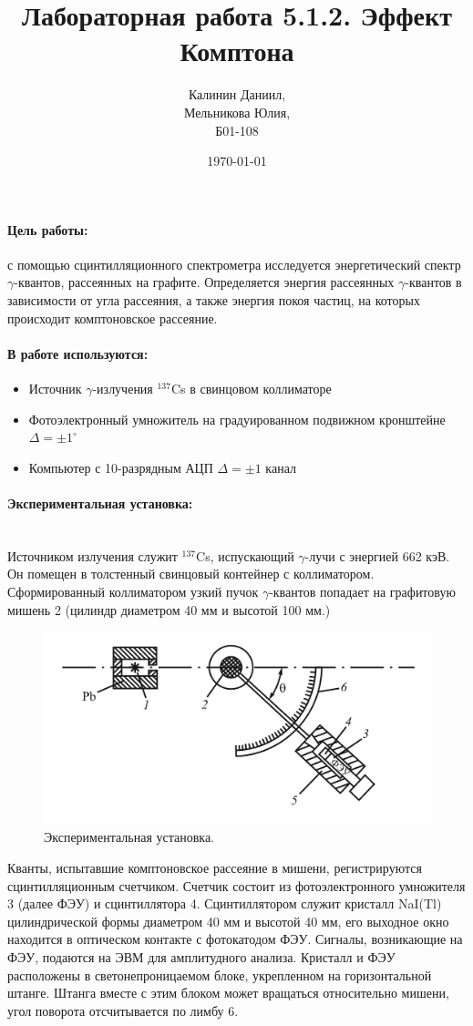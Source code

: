 \documentclass[a4paper, 12pt]{article}
\author{Калинин Даниил,\\Мельникова Юлия,\\Б01-108}
\date{\today}
\title{Лабораторная работа 5.1.2. Эффект Комптона}
\newcommand{\parag}[1]{\paragraph*{#1:}}
\begin{document}
\maketitle
\parindent=0cm

\parag {Цель работы}
с помощью сцинтилляционного спектрометра исследуется энергетический спектр $\gamma$-квантов, рассеянных на графите. Определяется энергия рассеянных $\gamma$-квантов в зависимости от угла рассеяния, а также энергия покоя частиц, на которых происходит комптоновское рассеяние.


\parag {В работе используются}
\begin{itemize}
		\item Источник $\gamma$-излучения $^{137}$Cs в свинцовом коллиматоре
		
        \item Фотоэлектронный умножитель на градуированном подвижном кронштейне $\Delta = \pm 1^\circ$ 
		
        \item Компьютер с 10-разрядным АЦП $\Delta = \pm 1$ канал
\end{itemize}

\parag {Экспериментальная установка}~\\
Источником излучения служит $^{137}$Cs, испускающий $\gamma$-лучи с энергией 662 кэВ. Он помещен в толстенный свинцовый контейнер с коллиматором. Сформированный коллиматором узкий пучок $\gamma$-квантов попадает на графитовую мишень 2 (цилиндр диаметром 40 мм и высотой 100 мм.)
	
\begin{figure}[h!]
    \centering
    \includegraphics[width=14cm]{ust.png}
    \caption{Экспериментальная установка.}
    \label{fig:ust}
\end{figure}

Кванты, испытавшие комптоновское рассеяние в мишени, регистрируются сцинтилляционным счетчиком. Счетчик состоит из фотоэлектронного умножителя 3 (далее ФЭУ) и сцинтиллятора 4. Сцинтиллятором служит кристалл NaI(Tl) цилиндрической формы диаметром 40 мм и высотой 40 мм, его выходное окно находится в оптическом контакте с фотокатодом ФЭУ. Сигналы, возникающие на ФЭУ, подаются на ЭВМ для амплитудного анализа. Кристалл и ФЭУ расположены в светонепроницаемом блоке, укрепленном на горизонтальной штанге. Штанга вместе с этим блоком может вращаться относительно мишени, угол поворота отсчитывается по лимбу 6.
	
\end{document}
